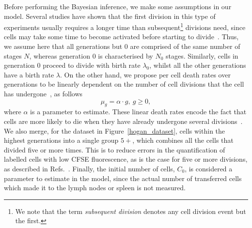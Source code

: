 \documentclass[10pt]{article}
\numberwithin{equation}{section}
\begin{document}
Before performing the Bayesian inference, we make some assumptions in our model. Several studies  have shown that the first division in this type of experiments usually requires a longer time than subsequent\footnote{We note that the term {\em subsequent division} denotes any cell division event but the first.} divisions need, since cells may take some time to become activated before starting to divide~\cite{hawkins2007model,kinjyo2015real,markham2010minimum}. Thus, we assume here that all generations but $0$ are comprised of the same number of stages $N$, whereas generation $0$ is characterised by $N_0$ stages. Similarly, cells in generation $0$ proceed to divide with birth rate $\lambda_0$, whilst all the other generations have a birth rate $\lambda$. On the other hand, we propose 
per cell death rates over generations to be linearly dependent on the number of cell divisions that the cell has undergone~\cite{ganusov,mazzocco},  as follows
\begin{equation}
    \label{death_rates}
    \mu_g = \alpha \cdot g, \ g \ge 0,
\end{equation}
where $\alpha$ is a parameter to estimate. These linear death rates 
encode the fact that cells are more likely to die when they have already undergone several divisions~\cite{ganusov,mazzocco}. We also merge, for the dataset in 
Figure~\ref{hogan_dataset}, cells within the highest generations into a single group $5+$, which combines all the cells that divided five or more times. This is to reduce errors in the quantification of labelled cells with low CFSE fluorescence,
as is the case for five or more divisions, 
as described in Refs.~\cite{de2006estimating,ganusov}. Finally, the initial number of cells, $C_0$, is considered  a parameter to estimate in the model, since the actual number of transferred cells which made it to the lymph nodes or spleen is not measured.
\end{document}
